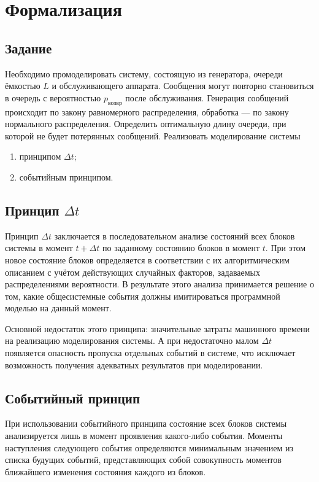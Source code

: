 \documentclass[a4paper,oneside,12pt]{extreport}
\begin{document}


\tableofcontents

\chapter{Формализация}

\section{Задание}

Необходимо промоделировать систему, состоящую из генератора, очереди ёмкостью $L$ и обслуживающего аппарата.
Сообщения могут повторно становиться в очередь с вероятностью $p_{\text{возвр}}$ после обслуживания.
Генерация сообщений происходит по закону равномерного распределения, обработка — по закону нормального распределения.
Определить оптимальную длину очереди, при которой не будет потерянных сообщений.
Реализовать моделирование системы
\begin{enumerate}
	\item принципом $\Delta t$;
	\item событийным принципом.
\end{enumerate}

\section{Принцип $\Delta t$}

Принцип $\Delta t$ заключается в последовательном анализе состояний всех блоков системы в момент $t + \Delta t$  по заданному состоянию блоков в момент $t$.
При этом новое состояние блоков определяется в соответствии с их алгоритмическим описанием с учётом действующих случайных факторов, задаваемых распределениями вероятности.
В результате этого анализа принимается решение о том, какие общесистемные события должны имитироваться программной моделью на данный момент.

Основной недостаток этого принципа: значительные затраты машинного времени на реализацию моделирования системы.
А при недостаточно малом $\Delta t$ появляется опасность пропуска отдельных событий в системе, что исключает возможность получения адекватных результатов при моделировании.

\section{Событийный принцип}

При использовании событийного принципа состояние всех блоков системы анализируется лишь в момент проявления какого-либо события.
Моменты наступления следующего события определяются минимальным значением из списка будущих событий, представляющих собой совокупность моментов ближайшего изменения состояния каждого из блоков.
\end{document}
